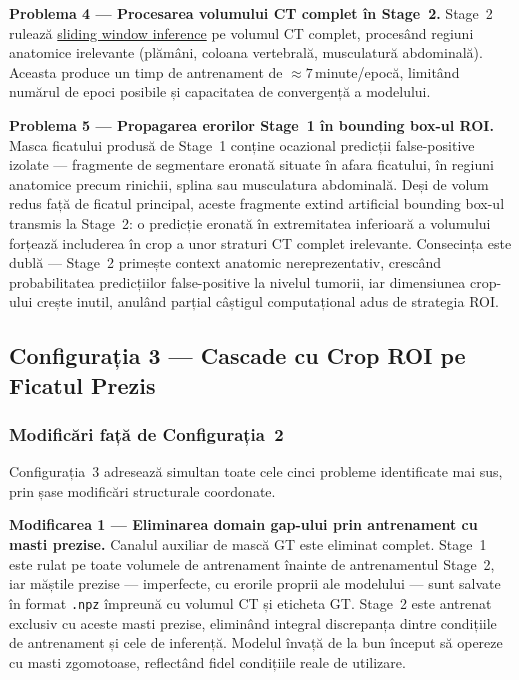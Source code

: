 \documentclass[12pt, a4paper]{report}
\begin{document}
\textbf{Problema 4 — Procesarea volumului CT complet în Stage~2.}
Stage~2 rulează \hyperref[sec:overlap]{sliding window inference} pe volumul CT
complet, procesând regiuni anatomice irelevante (plămâni, coloana vertebrală,
musculatură abdominală). Aceasta produce un timp de antrenament de
$\approx7$\,minute/epocă, limitând numărul de epoci posibile și capacitatea
de convergență a modelului.

\textbf{Problema 5 — Propagarea erorilor Stage~1 în bounding box-ul ROI.}
Masca ficatului produsă de Stage~1 conține ocazional predicții false-positive
izolate — fragmente de segmentare eronată situate în afara ficatului, în regiuni
anatomice precum rinichii, splina sau musculatura abdominală. Deși de volum redus
față de ficatul principal, aceste fragmente extind artificial bounding box-ul
transmis la Stage~2: o predicție eronată în extremitatea inferioară a volumului
forțează includerea în crop a unor straturi CT complet irelevante. Consecința
este dublă — Stage~2 primește context anatomic nereprezentativ, crescând
probabilitatea predicțiilor false-positive la nivelul tumorii, iar dimensiunea
crop-ului crește inutil, anulând parțial câștigul computațional adus de
strategia ROI.



\subsection{Configurația 3 — Cascade cu Crop ROI pe Ficatul Prezis}
\label{sec:config3}

\subsubsection*{Modificări față de Configurația~2}

Configurația~3 adresează simultan toate cele cinci probleme identificate mai sus,
prin șase modificări structurale coordonate.

\textbf{Modificarea 1 — Eliminarea domain gap-ului prin antrenament cu masti prezise.}
Canalul auxiliar de mască GT este eliminat complet. Stage~1 este rulat pe toate
volumele de antrenament înainte de antrenamentul Stage~2, iar măștile prezise —
imperfecte, cu erorile proprii ale modelului — sunt salvate în format \texttt{.npz}
împreună cu volumul CT și eticheta GT. Stage~2 este antrenat exclusiv cu aceste
masti prezise, eliminând integral discrepanța dintre condițiile de antrenament și
cele de inferență. Modelul învață de la bun început să opereze cu masti zgomotoase,
reflectând fidel condițiile reale de utilizare.
\end{document}
